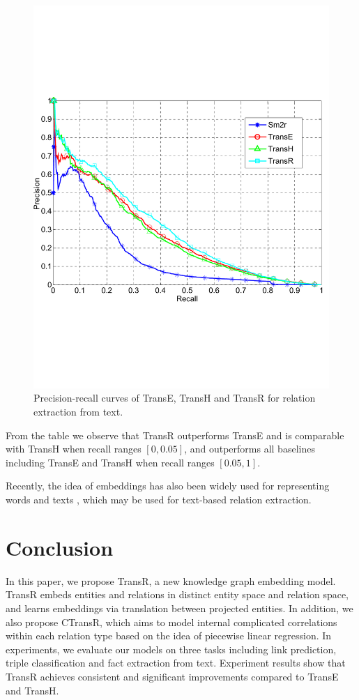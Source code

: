    \begin{figure}[htb]
    \centering
    \includegraphics[width=0.8\columnwidth]{figures/trans/RE_text}
    \caption{Precision-recall curves of TransE, TransH and TransR for relation extraction from text.}
    \label{fig:relation_extraction}
    \end{figure}

    From the table we observe that TransR outperforms TransE and is comparable with TransH when recall ranges $[0, 0.05]$, and outperforms all baselines including TransE and TransH when recall ranges $[0.05, 1]$.

    Recently, the idea of embeddings has also been widely used for representing words and texts , which may be used for text-based relation extraction.

    \section{Conclusion}
      In this paper, we propose TransR, a new knowledge graph embedding model. TransR embeds entities and relations in distinct entity space and relation space, and learns embeddings via translation between projected entities. In addition, we also propose CTransR, which aims to model internal complicated correlations within each relation type based on the idea of piecewise linear regression. In experiments, we evaluate our models on three tasks including link prediction, triple classification and fact extraction from text. Experiment results show that TransR achieves consistent and significant improvements compared to TransE and TransH.

